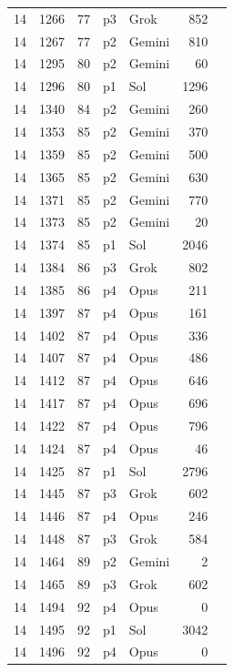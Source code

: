 \begin{longtable}{r r r l l r L{2.2in}}
14 & 1266 & 77 & p3 & Grok & 852 &  \\
14 & 1267 & 77 & p2 & Gemini & 810 &  \\
14 & 1295 & 80 & p2 & Gemini & 60 &  \\
14 & 1296 & 80 & p1 & Sol & 1296 &  \\
14 & 1340 & 84 & p2 & Gemini & 260 &  \\
14 & 1353 & 85 & p2 & Gemini & 370 &  \\
14 & 1359 & 85 & p2 & Gemini & 500 &  \\
14 & 1365 & 85 & p2 & Gemini & 630 &  \\
14 & 1371 & 85 & p2 & Gemini & 770 &  \\
14 & 1373 & 85 & p2 & Gemini & 20 &  \\
14 & 1374 & 85 & p1 & Sol & 2046 &  \\
14 & 1384 & 86 & p3 & Grok & 802 &  \\
14 & 1385 & 86 & p4 & Opus & 211 &  \\
14 & 1397 & 87 & p4 & Opus & 161 &  \\
14 & 1402 & 87 & p4 & Opus & 336 &  \\
14 & 1407 & 87 & p4 & Opus & 486 &  \\
14 & 1412 & 87 & p4 & Opus & 646 &  \\
14 & 1417 & 87 & p4 & Opus & 696 &  \\
14 & 1422 & 87 & p4 & Opus & 796 &  \\
14 & 1424 & 87 & p4 & Opus & 46 &  \\
14 & 1425 & 87 & p1 & Sol & 2796 &  \\
14 & 1445 & 87 & p3 & Grok & 602 &  \\
14 & 1446 & 87 & p4 & Opus & 246 &  \\
14 & 1448 & 87 & p3 & Grok & 584 &  \\
14 & 1464 & 89 & p2 & Gemini & 2 &  \\
14 & 1465 & 89 & p3 & Grok & 602 &  \\
14 & 1494 & 92 & p4 & Opus & 0 &  \\
14 & 1495 & 92 & p1 & Sol & 3042 &  \\
14 & 1496 & 92 & p4 & Opus & 0 &  \\

\end{longtable}
